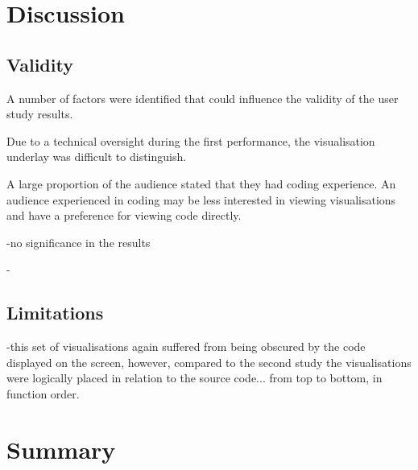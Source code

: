 \section{Discussion}




\subsection{Validity}

A number of factors were identified that could influence the validity of the user study results.

Due to a technical oversight during the first performance, the visualisation underlay was difficult to distinguish. 

A large proportion of the audience stated that they had coding experience. An audience experienced in coding may be less interested in viewing visualisations and have a preference for viewing code directly.

-no significance in the results

-

\subsection{Limitations}

-this set of visualisations again suffered from being obscured by the code displayed on the screen, however, compared to the second study the visualisations were logically placed in relation to the source code... from top to bottom, in function order.



\section{Summary}










